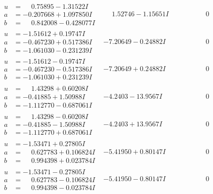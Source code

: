 \documentclass[1p]{elsarticle_modified}
\theoremstyle{definition}
\begin{document}
$$\begin{array}{c|c|c}
\begin{aligned}
u &= \phantom{-}0.75895 - 1.31522 I \\
a &= -0.207668 + 1.097850 I \\
b &= \phantom{-}0.842008 - 0.428077 I\end{aligned}
 & \phantom{-}1.52746 - 1.15651 I & \phantom{-0.000000 } 0 \\ \hline\begin{aligned}
u &= -1.51612 + 0.19747 I \\
a &= -0.467230 + 0.517386 I \\
b &= -1.061030 - 0.231239 I\end{aligned}
 & -7.20649 - 0.24882 I & \phantom{-0.000000 } 0 \\ \hline\begin{aligned}
u &= -1.51612 - 0.19747 I \\
a &= -0.467230 - 0.517386 I \\
b &= -1.061030 + 0.231239 I\end{aligned}
 & -7.20649 + 0.24882 I & \phantom{-0.000000 } 0 \\ \hline\begin{aligned}
u &= \phantom{-}1.43298 + 0.60208 I \\
a &= -0.41885 + 1.50988 I \\
b &= -1.112770 - 0.687061 I\end{aligned}
 & -4.2403 - 13.9567 I & \phantom{-0.000000 } 0 \\ \hline\begin{aligned}
u &= \phantom{-}1.43298 - 0.60208 I \\
a &= -0.41885 - 1.50988 I \\
b &= -1.112770 + 0.687061 I\end{aligned}
 & -4.2403 + 13.9567 I & \phantom{-0.000000 } 0 \\ \hline\begin{aligned}
u &= -1.53471 + 0.27805 I \\
a &= \phantom{-}0.627783 + 0.106824 I \\
b &= \phantom{-}0.994398 + 0.023784 I\end{aligned}
 & -5.41950 + 0.80147 I & \phantom{-0.000000 } 0 \\ \hline\begin{aligned}
u &= -1.53471 - 0.27805 I \\
a &= \phantom{-}0.627783 - 0.106824 I \\
b &= \phantom{-}0.994398 - 0.023784 I\end{aligned}
 & -5.41950 - 0.80147 I & \phantom{-0.000000 } 0 \\ \hline\begin{aligned}

\end{aligned}
\end{array}$$
\end{document}
